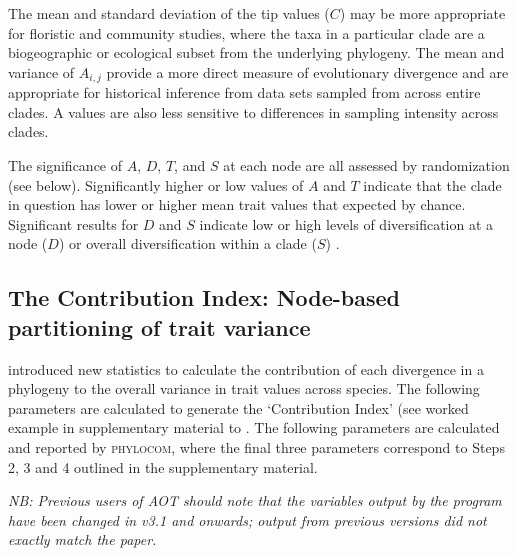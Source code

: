 \documentclass[12pt,letterpaper]{article}
\begin{document}
The mean and standard deviation of the tip values ($C$) may be more
appropriate for floristic and community studies, where the taxa in a
particular clade are a biogeographic or ecological subset from the
underlying phylogeny. The mean and variance of $A_{i,j}$ provide a more
direct measure of evolutionary divergence and are appropriate for
historical inference from data sets sampled from across entire
clades. A values are also less sensitive to differences in sampling
intensity across clades.

The significance of $A$, $D$, $T$, and $S$ at each node are all
assessed by randomization (see below). Significantly higher or low
values of $A$ and $T$ indicate that the clade in question has lower or
higher mean trait values that expected by chance. Significant results
for $D$ and $S$ indicate low or high levels of diversification at a node
($D$) or overall diversification within a clade ($S$)
\citep[see][]{losos2002tes, ackerly2004evo}.

\subsection{The Contribution Index: Node-based partitioning of trait
  variance}

\citet{moles2005briX} introduced new statistics to calculate the
contribution of each divergence in a phylogeny to the overall variance
in trait values across species. The following parameters are
calculated to generate the `Contribution Index' (see worked example in
supplementary material to \citet{moles2005briX}. The following
parameters are calculated and reported by {\scshape phylocom}, where the
final three parameters correspond to Steps 2, 3 and 4 outlined in the
\citet{moles2005briX} supplementary material.

\textit{NB: Previous users of AOT should note that the variables
  output by the program have been changed in v3.1 and onwards; output
  from previous versions did not exactly match the
  \citet{moles2005briX} paper.}
\end{document}
